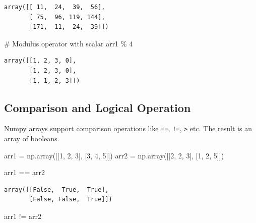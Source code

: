 \documentclass[
  letterpaper,
  DIV=11,
  numbers=noendperiod]{scrreprt}
\newenvironment{Shaded}{\begin{snugshade}}{\end{snugshade}}
\newcommand{\CommentTok}[1]{\textcolor[rgb]{0.37,0.37,0.37}{#1}}
\newcommand{\DecValTok}[1]{\textcolor[rgb]{0.68,0.00,0.00}{#1}}
\newcommand{\NormalTok}[1]{\textcolor[rgb]{0.00,0.23,0.31}{#1}}
\newcommand{\OperatorTok}[1]{\textcolor[rgb]{0.37,0.37,0.37}{#1}}
\begin{document}
\begin{verbatim}
array([[ 11,  24,  39,  56],
       [ 75,  96, 119, 144],
       [171,  11,  24,  39]])
\end{verbatim}

\begin{Shaded}
\begin{Highlighting}[]
\CommentTok{\# Modulus operator with scalar}
\NormalTok{arr1 }\OperatorTok{\%} \DecValTok{4}
\end{Highlighting}
\end{Shaded}

\begin{verbatim}
array([[1, 2, 3, 0],
       [1, 2, 3, 0],
       [1, 1, 2, 3]])
\end{verbatim}

\hypertarget{comparison-and-logical-operation}{%
\subsection{Comparison and Logical
Operation}\label{comparison-and-logical-operation}}

Numpy arrays support comparison operations like \texttt{==},
\texttt{!=}, \texttt{\textgreater{}} etc. The result is an array of
booleans.

\begin{Shaded}
\begin{Highlighting}[]
\NormalTok{arr1 }\OperatorTok{=}\NormalTok{ np.array([[}\DecValTok{1}\NormalTok{, }\DecValTok{2}\NormalTok{, }\DecValTok{3}\NormalTok{], [}\DecValTok{3}\NormalTok{, }\DecValTok{4}\NormalTok{, }\DecValTok{5}\NormalTok{]])}
\NormalTok{arr2 }\OperatorTok{=}\NormalTok{ np.array([[}\DecValTok{2}\NormalTok{, }\DecValTok{2}\NormalTok{, }\DecValTok{3}\NormalTok{], [}\DecValTok{1}\NormalTok{, }\DecValTok{2}\NormalTok{, }\DecValTok{5}\NormalTok{]])}
\end{Highlighting}
\end{Shaded}

\begin{Shaded}
\begin{Highlighting}[]
\NormalTok{arr1 }\OperatorTok{==}\NormalTok{ arr2}
\end{Highlighting}
\end{Shaded}

\begin{verbatim}
array([[False,  True,  True],
       [False, False,  True]])
\end{verbatim}

\begin{Shaded}
\begin{Highlighting}[]
\NormalTok{arr1 }\OperatorTok{!=}\NormalTok{ arr2}
\end{Highlighting}
\end{Shaded}
\end{document}
